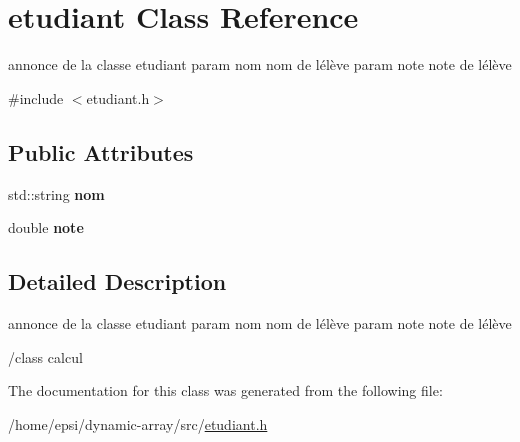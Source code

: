 \hypertarget{classetudiant}{}\section{etudiant Class Reference}
\label{classetudiant}


annonce de la classe etudiant param nom nom de l\textquotesingle{}élève param note note de l\textquotesingle{}élève  




{\ttfamily \#include $<$etudiant.\+h$>$}

\subsection*{Public Attributes}
\begin{DoxyCompactItemize}
\item 
\mbox{\label{classetudiant_ac822b96ff83a0626439c36e3b15ef7c9}} 
std\+::string {\bfseries nom}
\item 
\mbox{\label{classetudiant_a8976a5ae231e3b8c6135bc074b3cf7cf}} 
double {\bfseries note}
\end{DoxyCompactItemize}


\subsection{Detailed Description}
annonce de la classe etudiant param nom nom de l\textquotesingle{}élève param note note de l\textquotesingle{}élève 

/class calcul 

The documentation for this class was generated from the following file\+:\begin{DoxyCompactItemize}
\item 
/home/epsi/dynamic-\/array/src/\hyperlink{etudiant_8h}{etudiant.\+h}\end{DoxyCompactItemize}
